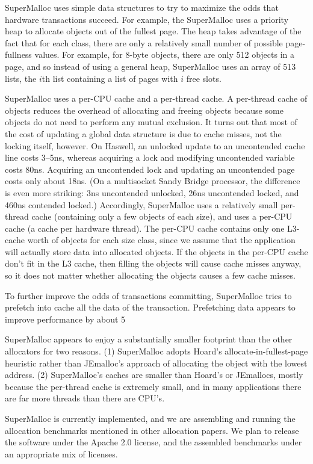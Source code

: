 \documentclass[10pt,letterpaper]{article}
\begin{document}
SuperMalloc uses simple data structures to try to maximize the odds that hardware transactions succeed. For example, the SuperMalloc uses a priority heap to allocate objects out of the fullest page. The heap takes advantage of the fact that for each class, there are only a relatively small number of possible page-fullness values. For example, for 8-byte objects, there are only 512 objects in a page, and so instead of using a general heap, SuperMalloc uses an array of 513 lists, the $i$th list containing a list of pages with $i$ free slots.

SuperMalloc uses a per-CPU cache and a per-thread cache. A per-thread cache of objects reduces the overhead of allocating and freeing objects because some objects do not need to perform any mutual exclusion. It turns out that most of the cost of updating a global data structure is due to cache misses, not the locking itself, however. On Haswell, an unlocked update to an uncontended cache line costs 3--5ns, whereas acquiring a lock and modifying uncontended variable costs 80ns. Acquiring an uncontended lock and updating an uncontended page costs only about 18ns. (On a multisocket Sandy Bridge processor, the difference is even more striking: 3ns uncontended unlocked, 26ns uncontended locked, and 460ns contended locked.) Accordingly, SuperMalloc uses a relatively small per-thread cache (containing only a few objects of each size), and uses a per-CPU cache (a cache per hardware thread). The per-CPU cache contains only one L3-cache worth of objects for each size class, since we assume that the application will actually store data into allocated objects. If the objects in the per-CPU cache don't fit in the L3 cache, then filling the objects will cause cache misses anyway, so it does not matter whether allocating the objects causes a few cache misses.

To further improve the odds of transactions committing, SuperMalloc tries to prefetch into cache all the data of the transaction. Prefetching data appears to improve performance by about 5%

SuperMalloc appears to enjoy a substantially smaller footprint than the other allocators for two reasons. (1) SuperMalloc adopts Hoard's allocate-in-fullest-page heuristic rather than JEmalloc's approach of allocating the object with the lowest address. (2) SuperMalloc's caches are smaller than Hoard's or JEmallocs, mostly because the per-thread cache is extremely small, and in many applications there are far more threads than there are CPU's.

SuperMalloc is currently implemented, and we are assembling and running the allocation benchmarks mentioned in other allocation papers. We plan to release the software under the Apache 2.0 license, and the assembled benchmarks under an appropriate mix of licenses.
\end{document}
